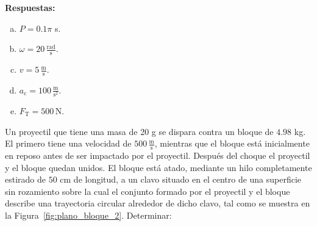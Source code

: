 \documentclass[addpoints]{exam}
\newcommand{\rtas}{\textbf{Respuestas: }}
\begin{document}
\begin{questions}

    \rtas
    \begin{enumerate}[a)]
        \item $P = 0.1 \pi$ s.
        \item $\omega = 20 \, \frac{\text{rad}}{\text{s}}$.
        \item $v = 5 \, \frac{\text{m}}{\text{s}}$.
        \item $a_\text{c} = 100 \, \frac{\text{m}}{\text{s}^2}$.
        \item $F_\text{T} = 500 \, \text{N}$.
    \end{enumerate}

    \question Un proyectil que tiene una masa de 20 g se dispara contra un bloque de $4.98$ kg. El primero tiene una velocidad de $500 \, \frac{\text{m}}{\text{s}}$, mientras que el bloque está inicialmente en reposo antes de ser impactado por el proyectil. Después del choque el proyectil y el bloque quedan unidos. El bloque está atado, mediante un hilo completamente estirado de $50$ cm de longitud, a un clavo situado en el centro de una superficie sin rozamiento sobre la cual el conjunto formado por el proyectil y el bloque describe una trayectoria circular alrededor de dicho clavo, tal como se muestra en la Figura~\ref{fig:plano_bloque_2}. Determinar: \label{ej:plano_bloque_2}
    \begin{parts}

\end{parts}
\end{questions}
\end{document}
